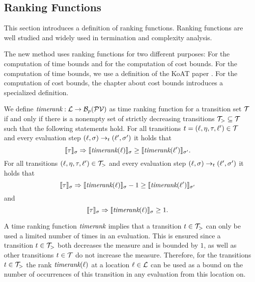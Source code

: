 \subsection{Ranking Functions}

This section introduces a definition of ranking functions.
Ranking functions are well studied \cite{bradley2005polyranking, podelski2004prf, bradley2005linear, bagnara2012new, leike2014ranking, ben2013linear} and widely used in termination and complexity analysis.

The new method uses ranking functions for two different purposes:
For the computation of time bounds and for the computation of cost bounds.
For the computation of time bounds, we use a definition of the KoAT paper \cite{koat}.
For the computation of cost bounds, the chapter about cost bounds introduces a specialized definition.

\begin{definition} 
  We define $\emph{timerank}: \mathcal{L} \rightarrow \mathcal{B}_p(\mathcal{PV})$ as time ranking function for a transition set $\mathcal{T}$ if and only if there is a nonempty set of strictly decreasing transitions $\mathcal{T}_{>} \subseteq \mathcal{T}$ such that the following statements hold.
  For all transitions $t = (\ell, \eta, \tau, \ell') \in \mathcal{T}$ and every evaluation step $(\ell, \sigma) \rightarrow_t (\ell', \sigma')$ it holds that
  \[ \llbracket \tau \rrbracket_{\sigma} \Rightarrow \llbracket \emph{timerank}(\ell) \rrbracket_{\sigma} \geq \llbracket \emph{timerank}(\ell') \rrbracket_{\sigma'}. \]
  For all transitions $(\ell, \eta, \tau, \ell') \in \mathcal{T}_{>}$ and every evaluation step $(\ell, \sigma) \rightarrow_t (\ell', \sigma')$ it holds that        
  \[ \llbracket \tau \rrbracket_{\sigma} \Rightarrow \llbracket \emph{timerank}(\ell) \rrbracket_{\sigma} - 1 \geq \llbracket \emph{timerank}(\ell') \rrbracket_{\sigma'} \]
  and
  \[ \llbracket \tau \rrbracket_{\sigma} \Rightarrow \llbracket \emph{timerank}(\ell) \rrbracket_{\sigma} \geq 1. \]
\end{definition}

A time ranking function $\emph{timerank}$ implies that a transition $t \in \mathcal{T}_>$ can only be used a limited number of times in an evaluation.
This is ensured since a transition $t \in \mathcal{T}_>$ both decreases the measure and is bounded by $1$, as well as other transitions $t \in \mathcal{T}$ do not increase the measure.
Therefore, for the transitions $t \in \mathcal{T}_>$ the rank $\emph{timerank}(\ell)$ at a location $\ell \in \mathcal{L}$ can be used as a bound on the number of occurrences of this transition in any evaluation from this location on.

